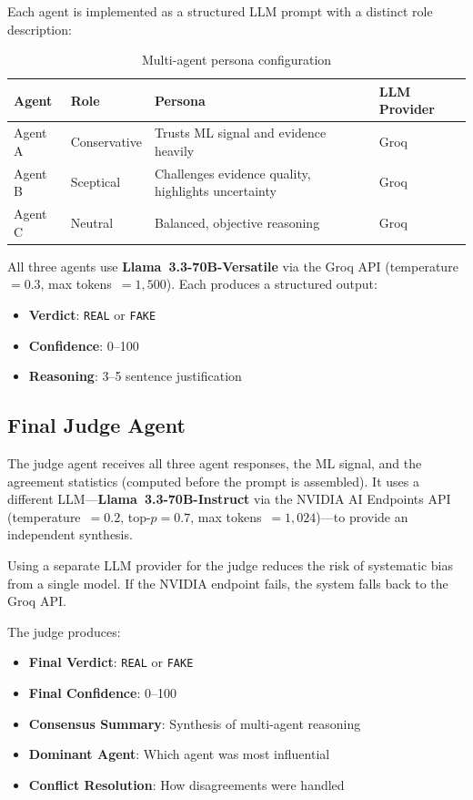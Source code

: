 \documentclass[12pt, a4paper]{article}
\begin{document}
Each agent is implemented as a structured LLM prompt with a distinct role
description:

\begin{table}[H]
\centering
\caption{Multi-agent persona configuration}
\label{tab:agents}
\begin{tabular}{@{}llll@{}}
\toprule
\textbf{Agent} & \textbf{Role} & \textbf{Persona} & \textbf{LLM Provider} \\
\midrule
Agent A & Conservative  & Trusts ML signal and evidence heavily
        & Groq \\
Agent B & Sceptical     & Challenges evidence quality, highlights uncertainty
        & Groq \\
Agent C & Neutral       & Balanced, objective reasoning
        & Groq \\
\bottomrule
\end{tabular}
\end{table}

All three agents use \textbf{Llama~3.3-70B-Versatile} via the Groq API
(temperature~$= 0.3$, max tokens~$= 1{,}500$). Each produces a structured
output:

\begin{itemize}[leftmargin=2em]
    \item \textbf{Verdict}: \texttt{REAL} or \texttt{FAKE}
    \item \textbf{Confidence}: 0--100
    \item \textbf{Reasoning}: 3--5 sentence justification
\end{itemize}


\subsection{Final Judge Agent}

The judge agent receives all three agent responses, the ML signal, and the
agreement statistics (computed before the prompt is assembled). It uses a
different LLM---\textbf{Llama~3.3-70B-Instruct} via the NVIDIA AI
Endpoints API (temperature~$= 0.2$, top-$p = 0.7$, max tokens~$=
1{,}024$)---to provide an independent synthesis.

Using a separate LLM provider for the judge reduces the risk of systematic
bias from a single model. If the NVIDIA endpoint fails, the system falls
back to the Groq API.

The judge produces:
\begin{itemize}[leftmargin=2em]
    \item \textbf{Final Verdict}: \texttt{REAL} or \texttt{FAKE}
    \item \textbf{Final Confidence}: 0--100
    \item \textbf{Consensus Summary}: Synthesis of multi-agent reasoning
    \item \textbf{Dominant Agent}: Which agent was most influential
    \item \textbf{Conflict Resolution}: How disagreements were handled
\end{itemize}
\end{document}
